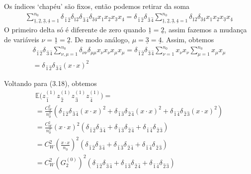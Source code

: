 \documentclass{beamer}
\newcommand{\EE}{\mathbb{E}}
\def\mi#1{{\,\widehat{#1}}}
\def\mj#1{\underline{#1}}
\begin{document}
\begin{frame}
	Os índices `chapéu' são fixos, então podemos retirar da soma
	\begin{multline*}
		\sum_{\mj1,\mj2,\mj3,\mj4=1}^{n_0} \delta_{\mi1\mi2}\delta_{\mj1\mj2}\delta_{\mi3\mi4}\delta_{\mj3\mj4} x_{\mj1}x_{\mj2}x_{\mj3}x_{\mj4}  = 
		\delta_{\mi1\mi2}\delta_{\mi3\mi4}\sum_{\mj1,\mj2,\mj3,\mj4=1}^{n_0}\delta_{\mj1\mj2}\delta_{\mj3\mj4} x_{\mj1}x_{\mj2}x_{\mj3}x_{\mj4} 
	\end{multline*}
	O primeiro delta só é diferente de zero quando $\mj1 = \mj2$, assim fazemos a mudança de variáveis $\nu = \mj1 = \mj2$. 
	De modo análogo, $\mu = \mj3 = \mj4$. Assim, obtemos
	\begin{multline*}
		\delta_{\mi1\mi2}\delta_{\mi3\mi4}\sum_{\nu,\mu=1}^{n_0}\delta_{\nu\nu}\delta_{\mu\mu} x_{\nu}x_{\nu}x_{\mu}x_{\mu} =
	\delta_{\mi1\mi2}\delta_{\mi3\mi4}\sum_{\nu=1}^{n_0}x_{\nu}x_{\nu} \sum_{\mu=1}^{n_0}x_{\mu}x_{\mu} \\
	= \delta_{\mi1\mi2}\delta_{\mi3\mi4} (x\cdot x)^2
	\end{multline*}
\end{frame}

\begin{frame}
	Voltando para (3.18), obtemos
	\begin{multline*}\tag{3.18}\label{eq:tresdezoito}
		\EE\big(z^{(1)}_{\mi1} z^{(1)}_{\mi2} z^{(1)}_{\mi3} z^{(1)}_{\mi4}\big) = \\
		 = \frac{C_W^2}{n_0^2}\left(\delta_{\mi1\mi2}\delta_{\mi3\mi4} (x\cdot x)^2 + \delta_{\mi1\mi3}\delta_{\mi2\mi4} (x\cdot x)^2 + \delta_{\mi1\mi4}\delta_{\mi2\mi3} (x\cdot x)^2 \right) \\
		 = \frac{C_W^2}{n_0^2} (x\cdot x)^2 \left(\delta_{\mi1\mi2}\delta_{\mi3\mi4} + \delta_{\mi1\mi3}\delta_{\mi2\mi4} + \delta_{\mi1\mi4}\delta_{\mi2\mi3} \right)\\
		 = C_W^2 \left(\frac{x\cdot x}{n_0}\right)^2 \left(\delta_{\mi1\mi2}\delta_{\mi3\mi4} + \delta_{\mi1\mi3}\delta_{\mi2\mi4} + \delta_{\mi1\mi4}\delta_{\mi2\mi3} \right)\\
		 = C_W^2 \left(G^{(0)}_2 \right)^2\left(\delta_{\mi1\mi2}\delta_{\mi3\mi4} + \delta_{\mi1\mi3}\delta_{\mi2\mi4} + \delta_{\mi1\mi4}\delta_{\mi2\mi3} \right)
	\end{multline*}
\end{frame}
\end{document}
